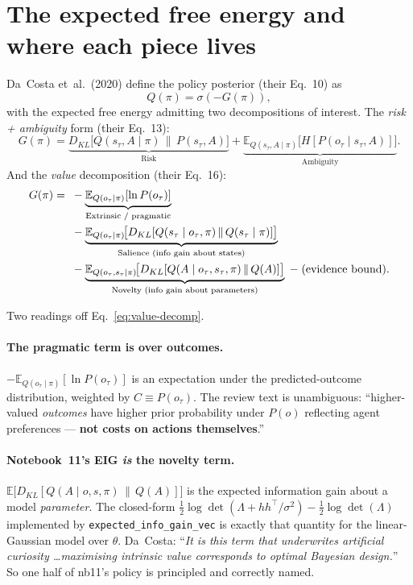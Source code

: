 \documentclass[11pt,a4paper]{article}
\theoremstyle{plain}
\begin{document}
\section{The expected free energy and where each piece lives}

Da~Costa et~al.~(2020) define the policy posterior (their Eq.~10) as
\begin{equation}
Q(\pi) = \sigma(-G(\pi)),
\label{eq:Qpi}
\end{equation}
with the expected free energy admitting two decompositions of interest.
The \emph{risk + ambiguity} form (their Eq.~13):
\begin{equation}
G(\pi) =
\underbrace{D_{KL}\!\big[Q(s_\tau,A\mid\pi)\,\big\|\,P(s_\tau,A)\big]}_{\text{Risk}}
+
\underbrace{\mathbb{E}_{Q(s_\tau,A\mid\pi)}\!\big[H[P(o_\tau\mid s_\tau,A)]\big]}_{\text{Ambiguity}}.
\label{eq:risk-ambiguity}
\end{equation}
And the \emph{value} decomposition (their Eq.~16):
\begin{align}
G(\pi) =\;{}&
- \underbrace{\mathbb{E}_{Q(o_\tau\mid\pi)}[\ln P(o_\tau)]}_{\text{Extrinsic / pragmatic}} \notag\\
& - \underbrace{\mathbb{E}_{Q(o_\tau\mid\pi)}\!\big[D_{KL}[Q(s_\tau\mid o_\tau,\pi)\,\|\,Q(s_\tau\mid\pi)]\big]}_{\text{Salience (info gain about states)}} \notag\\
& - \underbrace{\mathbb{E}_{Q(o_\tau,s_\tau\mid\pi)}\!\big[D_{KL}[Q(A\mid o_\tau,s_\tau,\pi)\,\|\,Q(A)]\big]}_{\text{Novelty (info gain about parameters)}}
\;-\; (\text{evidence bound}).
\label{eq:value-decomp}
\end{align}

Two readings off Eq.~\eqref{eq:value-decomp}.

\paragraph{The pragmatic term is over outcomes.}
$-\mathbb{E}_{Q(o_\tau\mid\pi)}[\ln P(o_\tau)]$ is an expectation under
the predicted-outcome distribution, weighted by $C \equiv P(o_\tau)$.
The review text is unambiguous: ``higher-valued \emph{outcomes} have
higher prior probability under $P(o)$ reflecting agent preferences ---
\textbf{not costs on actions themselves}.''

\paragraph{Notebook~11's EIG \emph{is} the novelty term.}
$\mathbb{E}\big[D_{KL}[Q(A\mid o,s,\pi)\,\|\,Q(A)]\big]$ is the expected
information gain about a model \emph{parameter}. The closed-form
$\tfrac12\log\det(\Lambda + hh^\top/\sigma^2) - \tfrac12\log\det(\Lambda)$
implemented by \texttt{expected\_info\_gain\_vec} is exactly that
quantity for the linear-Gaussian model over $\theta$. Da~Costa: ``\emph{It
is this term that underwrites artificial curiosity \dots maximising
intrinsic value corresponds to optimal Bayesian design.}'' So one half
of nb11's policy is principled and correctly named.
\end{document}
